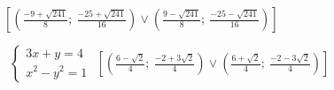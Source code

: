 \begin{esercizio}[\Ast]
\begin{enumeratea}
\hfill$\left[\left(\frac{-9+\sqrt{241}} 8;~\frac{-25+\sqrt{241}}{16}\right)\vee 
\left(\frac{9-\sqrt{241}} 8;~\frac{-25-\sqrt{241}}{16}\right)\right]$
 \item~$\left\{\begin{array}{l}3x+y=4\\x^2-y^2=1\end{array}\right.$
\hfill$\left[\left(\frac{6-\sqrt 2} 4;~\frac{-2+3\sqrt 2} 4\right)\vee \left(\frac{6+\sqrt 
2} 4;~\frac{-2-3\sqrt 2} 4\right)\right]$
 \end{enumeratea}
\end{esercizio}

